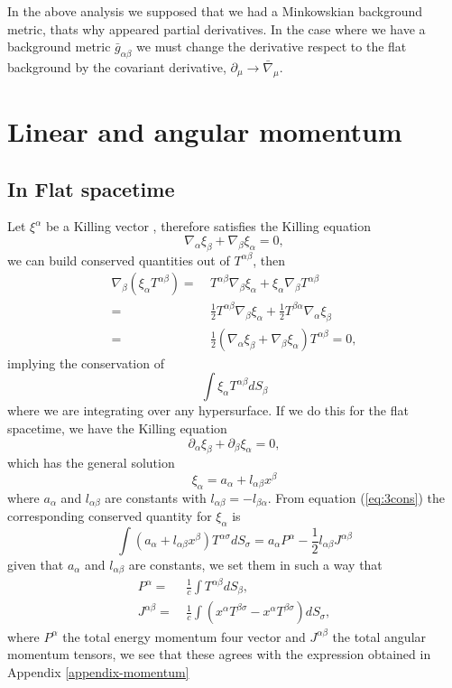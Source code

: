In the above analysis we supposed that we had a Minkowskian background
metric, thats why appeared partial derivatives. In the case where
we have a background metric $\bar{g}_{\alpha\beta}$ we must change
the derivative respect to the flat background by the covariant derivative,
$\partial_{\mu}\rightarrow\bar{\nabla}_{\mu}$. 

\section{Linear and angular momentum}

\subsection{In Flat spacetime}

Let $\xi^{\alpha}$ be a Killing vector , therefore satisfies the
Killing equation
\[
\nabla_{\alpha}\xi_{\beta}+\nabla_{\beta}\xi_{\alpha}=0,
\]
we can build conserved quantities out of $T^{\alpha\beta}$, then
\begin{align*}
\nabla_{\beta}\left(\xi_{\alpha}T^{\alpha\beta}\right)= & \ T^{\alpha\beta}\nabla_{\beta}\xi_{\alpha}+\xi_{\alpha}\nabla_{\beta}T^{\alpha\beta}\\
= & \ \frac{1}{2}T^{\alpha\beta}\nabla_{\beta}\xi_{\alpha}+\frac{1}{2}T^{\beta\alpha}\nabla_{\alpha}\xi_{\beta}\\
= & \ \frac{1}{2}\left(\nabla_{\alpha}\xi_{\beta}+\nabla_{\beta}\xi_{\alpha}\right)T^{\alpha\beta}=0,
\end{align*}
implying the conservation of
\begin{equation}
\int\xi_{\alpha}T^{\alpha\beta}dS_{\beta}\label{eq:3cons}
\end{equation}
where we are integrating over any hypersurface. If we do this for
the flat spacetime, we have the Killing equation
\[
\partial_{\alpha}\xi_{\beta}+\partial_{\beta}\xi_{\alpha}=0,
\]
which has the general solution
\begin{equation}
\label{eq:killing-general}
\xi_{\alpha}=a_{\alpha}+l_{\alpha\beta}x^{\beta}
\end{equation}
where $a_{\alpha}$ and $l_{\alpha\beta}$ are constants with $l_{\alpha\beta}=-l_{\beta\alpha}$.
From equation (\ref{eq:3cons}) the corresponding conserved quantity
for $\xi_{\alpha}$ is
\[
\int\left(a_{\alpha}+l_{\alpha\beta}x^{\beta}\right)T^{\alpha\sigma}dS_{\sigma}=a_{\alpha}P^{\alpha}-\frac{1}{2}l_{\alpha\beta}J^{\alpha\beta}
\]
given that $a_{\alpha}$ and $l_{\alpha\beta}$ are constants, we
set them in such a way that
\begin{align*}
P^{\alpha}= & \ \frac{1}{c}\int T^{\alpha\beta}dS_{\beta},\\
J^{\alpha\beta}= & \ \frac{1}{c}\int\left(x^{\alpha}T^{\beta\sigma}-x^{\alpha}T^{\beta\sigma}\right)dS_{\sigma},
\end{align*}
where $P^{\alpha}$ the total energy momentum four vector and $J^{\alpha\beta}$
the total angular momentum tensors, we see that these agrees with
the expression obtained in Appendix \ref{appendix-momentum}

